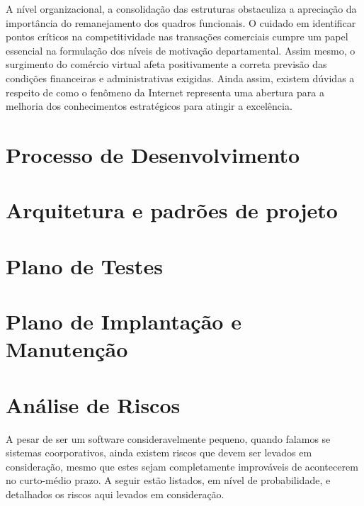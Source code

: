 \documentclass[12pt,a4paper]{report}
\begin{document}
A nível organizacional, a consolidação das estruturas obstaculiza a apreciação da importância do remanejamento dos quadros funcionais. O cuidado em identificar pontos críticos na competitividade nas transações comerciais cumpre um papel essencial na formulação dos níveis de motivação departamental. Assim mesmo, o surgimento do comércio virtual afeta positivamente a correta previsão das condições financeiras e administrativas exigidas. Ainda assim, existem dúvidas a respeito de como o fenômeno da Internet representa uma abertura para a melhoria dos conhecimentos estratégicos para atingir a excelência.

\chapter{Processo de Desenvolvimento}


\chapter{Arquitetura e padrões de projeto}


\chapter{Plano de Testes}

\chapter{Plano de Implantação e Manutenção}

\chapter{Análise de Riscos}

A pesar de ser um software consideravelmente pequeno, quando falamos se sistemas coorporativos, ainda existem riscos que devem ser levados em consideração, mesmo que estes sejam completamente improváveis de acontecerem no curto-médio prazo. A seguir estão listados, em nível de probabilidade, e detalhados os riscos aqui levados em consideração.
\end{document}
